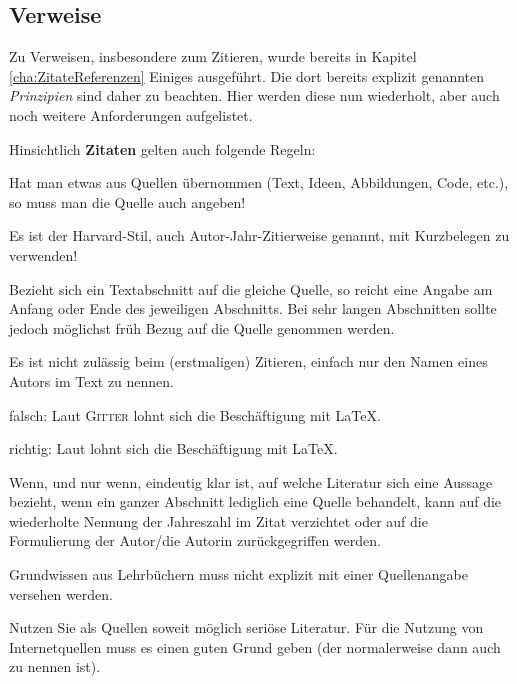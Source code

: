 \subsection{Verweise}
\label{subsec:Anh-Anforderungen-Verweise}
%
Zu Verweisen, insbesondere zum Zitieren, wurde bereits in Kapitel \ref{cha:ZitateReferenzen} Einiges ausgeführt. 
Die dort bereits explizit genannten \emph{Prinzipien} sind daher zu beachten. Hier werden diese nun wiederholt,
aber auch noch weitere Anforderungen aufgelistet.
%
\begin{compactitem}[\quad$\star$]
\item Hinsichtlich \textbf{Zitaten} gelten auch folgende Regeln:
  \begin{compactitem}[\quad\checkmark]
  \item Hat man etwas aus Quellen übernommen (Text, Ideen, Abbildungen, Code, etc.), so muss man die Quelle auch angeben!
  \item Es ist der Harvard-Stil, auch Autor-Jahr-Zitierweise genannt, mit Kurzbelegen zu verwenden!
  \item Bezieht sich ein Textabschnitt auf die gleiche Quelle, so reicht eine Angabe am Anfang oder Ende des
    jeweiligen Abschnitts. Bei sehr langen Abschnitten sollte jedoch möglichst früh Bezug auf die Quelle genommen werden.
  \item Es ist nicht zulässig beim (erstmaligen) Zitieren, einfach nur den Namen eines Autors im Text zu nennen.
    \begin{compactitem}[\quad--]
    \item falsch: \glqq Laut \textsc{Gitter} lohnt sich die Beschäftigung mit \LaTeX{}.\grqq
    \item richtig: \glqq Laut \textcite{Gitter2018} lohnt sich die Beschäftigung mit \LaTeX{}.\grqq
    \end{compactitem}
  \item Wenn, und nur wenn, eindeutig klar ist, auf welche Literatur sich eine Aussage bezieht, \dh wenn ein ganzer
    Abschnitt lediglich eine Quelle behandelt, kann auf die wiederholte Nennung der Jahreszahl im Zitat verzichtet 
    oder auf die Formulierung der \glqq Autor/die Autorin\grqq{} zurückgegriffen werden.
  \item Grundwissen aus Lehrbüchern muss nicht explizit mit einer Quellenangabe versehen werden.
  \item Nutzen Sie als Quellen soweit möglich seriöse Literatur. Für die Nutzung von Internetquellen muss es einen
    guten Grund geben (der normalerweise dann auch zu nennen ist).

\end{compactitem}
\end{compactitem}
